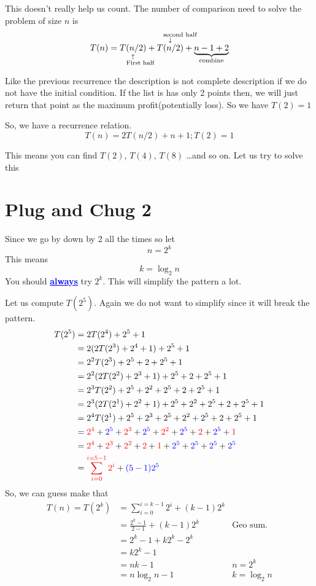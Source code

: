\documentclass[a4paper, 12pt]{article}
\newcommand{\kwd}[1]{\textcolor{blue}{\textbf{\underline{#1}}}}
\newcommand{\expl}[2]{%
	\underset{\substack{\uparrow\\\mathrlap{\text{\hspace{-1em}#2}}}}{#1}}
\newcommand{\uexpl}[2]{%
	\overset{\substack{\mathrlap{\text{\hspace{-1em}#2}}\\\downarrow}}{#1}}
\newcommand{\red}[1]{\textcolor{red}{#1}}
\newcommand{\blue}[1]{\textcolor{blue}{#1}}
\begin{document}
\begin{multicols}{2}
This doesn't really help us count. The number of comparison need to solve the problem of size $n$ is
\[
	T(n) = \expl{T(n/2)}{First half} + \uexpl{T(n/2)}{second half} + \underbrace{n-1+2}_{\text{combine}}
\]

Like the previous recurrence the description is not complete description if we do not have the initial condition. If the list is has only 2 points then, we will just return that point as the maximum profit(potentially loss). So we have $T(2) = 1$

So, we have a recurrence relation.
\[
T(n) = 2T(n/2) + n + 1; T(2) = 1
\]

This means you can find $T(2)$, $T(4)$, $T(8)$ \ldots and so on. Let us try to solve this

\section*{Plug and Chug 2}
Since we go by down by 2 all the times so let
\[
	n = 2^k
\]
This means
\[
k = \log_2 n
\]
You should \kwd{always} try $2^k$. This will simplify the pattern a lot. 

Let us compute $T(2^5)$. Again we do not want to simplify since it will break the pattern.
\begin{align*}
	T(2^5) &= 2 T(2^4) + 2^5 + 1\\
	& = 2(2T(2^3) + 2^4 + 1) + 2^5 + 1\\
	& = 2^2 T(2^3) +  2^5 + 2 + 2^5 + 1\\
	& = 2^2(2T(2^2) + 2^3 + 1) + 2^5 + 2 + 2^5 + 1\\
	& = 2^3T(2^2) + 2^5 + 2^2 + 2^5 + 2 + 2^5 + 1\\
	& = 2^3(2T(2^1) + 2^2 + 1) + 2^5 + 2^2 + 2^5 + 2 + 2^5 + 1\\
	& = 2^4T(2^1) + 2^5 + 2^3 + 2^5 + 2^2 + 2^5 + 2 + 2^5 + 1\\
	& = \red{2^4} + \blue{2^5} + \red{2^3} + \blue{2^5} + \red{2^2} + \blue{2^5} + \red{2} + \blue{2^5} + \red{1}\\
	& = \red{2^4}  + \red{2^3}  + \red{2^2} + \red{2} + \red{1} + \blue{2^5} + \blue{2^5} + \blue{2^5} + \blue{2^5}\\
	& = \red{\sum_{i=0}^{i=5-1}2^i} + \blue{(5-1) 2^5}
\end{align*}
So, we can guess make that
\begin{align*}
	T(n) = T(2^k) &= \sum_{i=0}^{i=k-1} 2^i + (k-1) 2^k\\
	& = \frac{2^k - 1}{2-1} + (k-1)2^k & \text{Geo sum.}\\
	& = 2^k - 1 + k2^k - 2^k\\
	& = k2^k -1\\
	& = nk -1 & n = 2^k\\
	& = n \log_2 n - 1 & k = \log_2 n
\end{align*}


\end{multicols}
\end{document}
